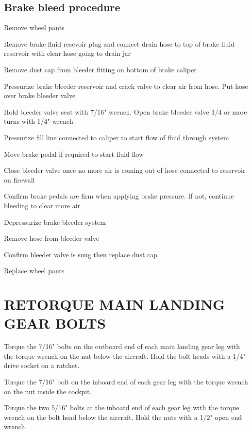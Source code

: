   \subsection{Brake bleed procedure}
    \begin{enumerate*}
      \item Remove wheel pants
      \item Remove brake fluid resevoir plug and connect drain hose to top of brake fluid reservoir with clear hose going to drain jar
      \item Remove dust cap from bleeder fitting on bottom of brake caliper
      \item Pressurize brake bleeder reservoir and crack valve to clear air from hose.  Put hose over brake bleeder valve
      \item Hold bleeder valve seat with 7/16"  wrench. Open brake bleeder valve 1/4 or more turns with 1/4" wrench
      \item Pressurize fill line connected to caliper to start flow of fluid through system
      \item Move brake pedal if required to start fluid flow
      \item Close bleeder valve once no more air is coming out of hose connected to reservoir on firewall
      \item Confirm brake pedals are firm when applying brake pressure.  If not, continue bleeding to clear more air
      \item Depressurize brake bleeder system
      \item Remove hose from bleeder valve
      \item Confirm bleeder valve is snug then replace dust cap
      \item Replace wheel pants
  \end{enumerate*}

\section{RETORQUE MAIN LANDING GEAR BOLTS}
  \begin{enumerate*}
    \item Torque the 7/16" bolts on the outboard end of each main landing gear leg with the torque wrench on the nut below the aircraft.  Hold the bolt heads with a 1/4" drive socket on a ratchet. 
    \item Torque the 7/16" bolt on the inboard end of each gear leg with the torque wrench on the nut inside the cockpit. 
    \item Torque the two 5/16" bolts at the inboard end of each gear leg with the torque wrench on the bolt head below the aircraft. Hold the nuts with a 1/2" open end wrench. 
\end{enumerate*}


